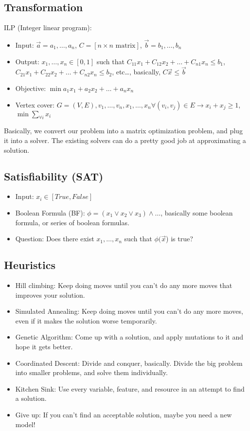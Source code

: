 \documentclass[10pt]{article}
\begin{document}
\subsection*{Transformation}
ILP (Integer linear program):
\begin{itemize}
	\item Input: $\vec{a} = a_1, \dots, a_n$, $C = [\text{$n \times n$ matrix}]$, $\vec{b} = b_1, \dots, b_n$
	\item Output: $x_1, \dots, x_n \in [0, 1]$ such that $C_{11}x_1 + C_{12}x_2 + \dots + C_{n1}x_n \leq b_1$, $C_{21}x_1 + C_{22}x_2 + \dots + C_{n2}x_n \leq b_2$, etc\dots, basically, $C\vec{x} \leq \vec{b}$
	\item Objective: $\min a_1x_1 + a_2 x_2 + \dots + a_n x_n$
	\item Vertex cover: $G = (V, E), v_1, \dots, v_n, x_1, \dots, x_n \forall(v_i, v_j) \in E \rightarrow x_i + x_j \geq 1$, $\min \sum_{\forall i} x_i$
\end{itemize}
Basically, we convert our problem into a matrix optimization problem, and plug it into a solver.  The existing solvers can do a pretty good job at approximating a solution.

\subsection*{Satisfiability (SAT)}
\begin{itemize}
	\item Input: $x_i \in [True, False]$
	\item Boolean Formula (BF): $\phi = (x_1 \lor x_2 \lor x_3) \land \dots$, basically some boolean formula, or series of boolean formulas.
	\item Question: Does there exist $x_1, \dots, x_n$ such that $\phi(\vec{x}$) is true?
\end{itemize}

\subsection*{Heuristics}
\begin{itemize}
	\item Hill climbing: Keep doing moves until you can't do any more moves that improves your solution.
	\item Simulated Annealing: Keep doing moves until you can't do any more moves, even if it makes the solution worse temporarily.
	\item Genetic Algorithm: Come up with a solution, and apply mutations to it and hope it gets better.
	\item Coordinated Descent: Divide and conquer, basically.  Divide the big problem into smaller problems, and solve them individually.
	\item Kitchen Sink: Use every variable, feature, and resource in an attempt to find a solution.
	\item Give up:  If you can't find an acceptable solution, maybe you need a new model!
\end{itemize}
\end{document}

